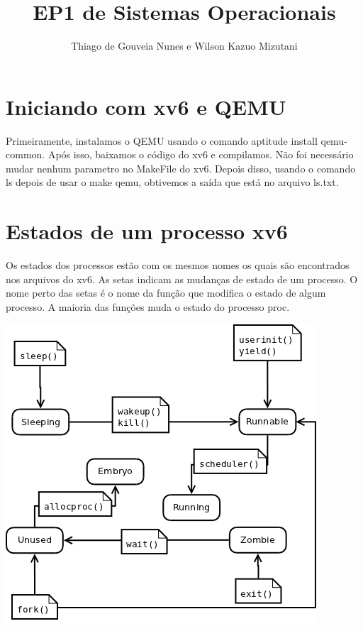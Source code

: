 \documentclass[a4paper,12pt]{article}
\begin{document}
\title{ EP1 de Sistemas Operacionais}
\author{ Thiago de Gouveia Nunes e Wilson Kazuo Mizutani}
\maketitle

\section{Iniciando com xv6 e QEMU}
    Primeiramente, instalamos o QEMU usando o comando aptitude install qemu-
common. Após isso, baixamos o código do xv6 e compilamos. Não foi necessário
mudar nenhum parametro no MakeFile do xv6. Depois disso, usando o comando ls
depois de usar o make qemu, obtivemos a saída que está no arquivo ls.txt.

\section{Estados de um processo xv6}

    Os estados dos processos estão com os mesmos nomes os quais são encontrados
nos arquivos do xv6. As setas indicam as mudanças de estado de um processo. O
nome perto das setas é o nome da função que modifica o estado de algum processo.
A maioria das funções muda o estado do processo proc.
\begin{center}
	\includegraphics[scale=0.40]{state.png}
\end{center}
\end{document}

